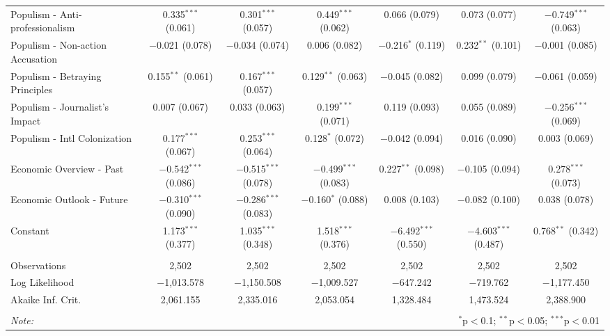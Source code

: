 \begin{table}[!htbp]
{\begin{tabular}{@{\extracolsep{5pt}}lcccccc}
    Populism - Anti-professionalism & 0.335$^{***}$ (0.061) & 0.301$^{***}$ (0.057) & 0.449$^{***}$ (0.062) & 0.066 (0.079) & 0.073 (0.077) & $-$0.749$^{***}$ (0.063) \\ 
    Populism - Non-action Accusation & $-$0.021 (0.078) & $-$0.034 (0.074) & 0.006 (0.082) & $-$0.216$^{*}$ (0.119) & 0.232$^{**}$ (0.101) & $-$0.001 (0.085) \\ 
    Populism - Betraying Principles & 0.155$^{**}$ (0.061) & 0.167$^{***}$ (0.057) & 0.129$^{**}$ (0.063) & $-$0.045 (0.082) & 0.099 (0.079) & $-$0.061 (0.059) \\ 
    Populism - Journalist's Impact & 0.007 (0.067) & 0.033 (0.063) & 0.199$^{***}$ (0.071) & 0.119 (0.093) & 0.055 (0.089) & $-$0.256$^{***}$ (0.069) \\ 
    Populism - Intl Colonization & 0.177$^{***}$ (0.067) & 0.253$^{***}$ (0.064) & 0.128$^{*}$ (0.072) & $-$0.042 (0.094) & 0.016 (0.090) & 0.003 (0.069) \\ 
    Economic Overview - Past & $-$0.542$^{***}$ (0.086) & $-$0.515$^{***}$ (0.078) & $-$0.499$^{***}$ (0.083) & 0.227$^{**}$ (0.098) & $-$0.105 (0.094) & 0.278$^{***}$ (0.073) \\ 
    Economic Outlook - Future & $-$0.310$^{***}$ (0.090) & $-$0.286$^{***}$ (0.083) & $-$0.160$^{*}$ (0.088) & 0.008 (0.103) & $-$0.082 (0.100) & 0.038 (0.078) \\ 
    Constant & 1.173$^{***}$ (0.377) & 1.035$^{***}$ (0.348) & 1.518$^{***}$ (0.376) & $-$6.492$^{***}$ (0.550) & $-$4.603$^{***}$ (0.487) & 0.768$^{**}$ (0.342) \\ 
   \hline \\[-1.8ex] 
  Observations & 2,502 & 2,502 & 2,502 & 2,502 & 2,502 & 2,502 \\ 
  Log Likelihood & $-$1,013.578 & $-$1,150.508 & $-$1,009.527 & $-$647.242 & $-$719.762 & $-$1,177.450 \\ 
  Akaike Inf. Crit. & 2,061.155 & 2,335.016 & 2,053.054 & 1,328.484 & 1,473.524 & 2,388.900 \\ 
  \hline 
  \hline \\[-1.8ex] 
  \textit{Note:}  & \multicolumn{6}{r}{$^{*}$p$<$0.1; $^{**}$p$<$0.05; $^{***}$p$<$0.01} \\ 
  \end{tabular} 
  }
  \end{table} 